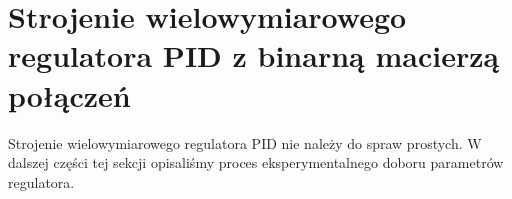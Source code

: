 \section{Strojenie wielowymiarowego regulatora PID z binarną macierzą połączeń}
\label{pro_pid_bin_conn}

Strojenie wielowymiarowego regulatora PID nie należy do spraw prostych.
W dalszej części tej sekcji opisaliśmy proces eksperymentalnego 
doboru parametrów regulatora.




